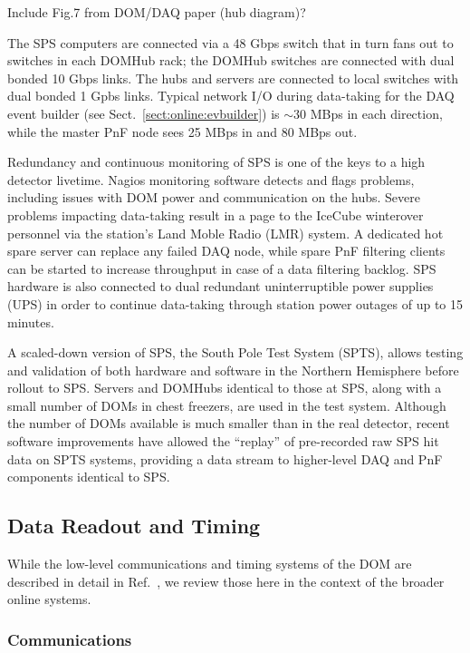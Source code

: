 Include Fig.7 from DOM/DAQ paper (hub diagram)?

The SPS computers are connected via a 48 Gbps switch that in turn fans out
to switches in each DOMHub rack; the DOMHub switches are connected with
dual bonded 10 Gbps links.  The hubs and servers are connected to local
switches with dual bonded 1 Gpbs links.  Typical network I/O during data-taking for the
DAQ event builder (see Sect.~\ref{sect:online:evbuilder}) is $\sim30$ MBps in each
direction, while the master PnF node sees 25 MBps in and 80 MBps out.

Redundancy and continuous monitoring of SPS is one of the keys to a high
detector livetime.  Nagios monitoring software detects and flags problems,
including issues with DOM power and communication on the hubs.  Severe
problems impacting data-taking result in a page to the IceCube
winterover personnel via the station's Land Moble Radio (LMR) system. 
A dedicated hot spare server can replace any failed DAQ
node, while spare PnF filtering clients can be started to increase
throughput in case of a data filtering backlog.  SPS hardware is also
connected to dual redundant uninterruptible power supplies 
(UPS) in order to continue data-taking through station power outages of up
to 15 minutes.  

A scaled-down version of SPS, the South Pole Test System (SPTS), allows
testing and validation of both hardware and software in the Northern
Hemisphere before rollout to SPS.  Servers and DOMHubs identical to those
at SPS, along with a small number of DOMs in chest freezers, are used in
the test system.  Although the number of DOMs available is much smaller
than in the real detector, recent software improvements have allowed the
``replay'' of pre-recorded raw SPS hit data on SPTS systems, providing a data stream to
higher-level DAQ and PnF components identical to SPS.

\subsection{Data Readout and Timing}

While the low-level communications and timing systems of the DOM are
described in detail in Ref.~\cite{ref:domdaq}, we review those here in the
context of the broader online systems.

\subsubsection{\label{sect:online:comms}Communications}

